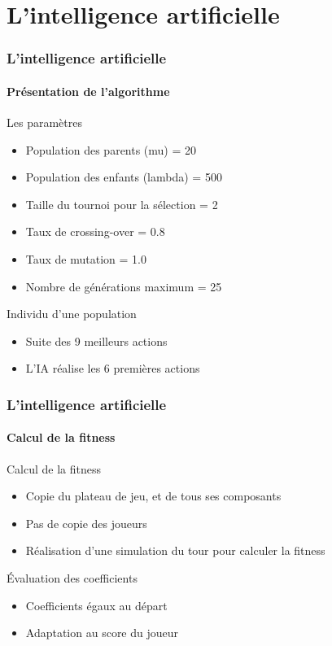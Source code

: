 \section{L'intelligence artificielle}

\begin{frame}
	\frametitle{L'intelligence artificielle}
	\framesubtitle{Présentation de l'algorithme}
	
	\begin{block}{Les paramètres}
		\begin{itemize}
			\item Population des parents (mu) = 20
			\item Population des enfants (lambda) = 500
			\item Taille du tournoi pour la sélection = 2
			\item Taux de crossing-over = 0.8
			\item Taux de mutation = 1.0
			\item Nombre de générations maximum = 25
		\end{itemize}
	\end{block}	
	
	\begin{exampleblock}{Individu d'une population}
		\begin{itemize}
			\item Suite des 9 meilleurs actions
			\item L'IA réalise les 6 premières actions
		\end{itemize}
	\end{exampleblock}	
\end{frame}

\begin{frame}
	\frametitle{L'intelligence artificielle}
	\framesubtitle{Calcul de la fitness}
	
	\begin{block}{Calcul de la fitness}
		\begin{itemize}
			\item Copie du plateau de jeu, et de tous ses composants
			\item Pas de copie des joueurs
			\item Réalisation d'une simulation du tour pour calculer la fitness
		\end{itemize}
	\end{block}

	\begin{block}{Évaluation des coefficients}
		\begin{itemize}
			\item Coefficients égaux au départ
			\item Adaptation au score du joueur
		\end{itemize}
	\end{block}
\end{frame}

